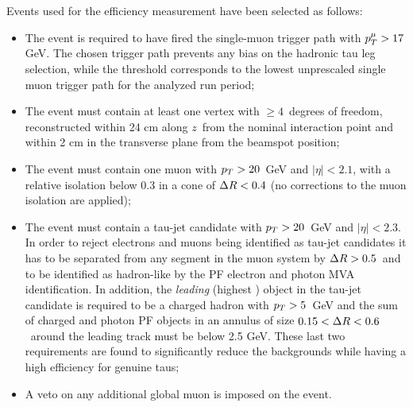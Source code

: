Events used for the efficiency measurement have been selected as follows:
\begin{itemize}
\item The event is required to have fired the single-muon trigger path with $p_{T}^\mu > 17$ GeV. The chosen trigger path prevents any bias on the hadronic tau leg selection, while the \pT threshold corresponds to the lowest unprescaled single muon trigger path for the analyzed run period;
\item The event must contain at least one vertex with $\geq 4$\ degrees of freedom, reconstructed within 24 cm along $z$\ from the nominal interaction point and within 2 cm in the transverse plane from the beamspot position;
\item The event must contain one muon with $p_{T} > 20$\ GeV and $|\eta| < 2.1$, with a relative isolation below 0.3 in a cone of $\Delta R < 0.4$ (no \db corrections to the muon isolation are applied);
\item The event must contain a tau-jet candidate with $p_{T} > 20$\ GeV and $|\eta| < 2.3$. In order to reject electrons and muons being identified as tau-jet candidates it has to be separated from any segment in the muon system by $\Delta R > 0.5$\ and to be identified as hadron-like by the PF electron and photon MVA identification. In addition, the \emph{leading} (highest \pT) object in the tau-jet candidate is required to be a charged hadron with $p_{T} > 5$\ GeV and the \pT sum of charged and photon PF objects in an annulus of size $0.15 < \Delta R < 0.6$\ around the leading track must be below 2.5 GeV. These last two requirements are found to significantly reduce the backgrounds while having a high efficiency for genuine taus;%
\item A veto on any additional global muon is imposed on the event.
\end{itemize}

